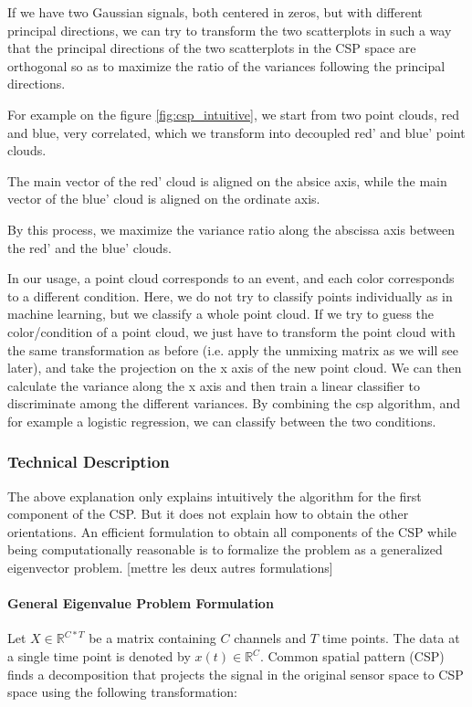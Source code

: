If we have two Gaussian signals, both centered in zeros, but with different principal directions, we can try to transform the two scatterplots in such a way that the principal directions of the two scatterplots in the CSP space are orthogonal so as to maximize the ratio of the variances following the principal directions.

For example on the figure \ref{fig:csp_intuitive}, we start from two point clouds, red and blue, very correlated, which we transform into decoupled red' and blue' point clouds.

The main vector of the red' cloud is aligned on the absice axis, while the main vector of the blue' cloud is aligned on the ordinate axis.

By this process, we maximize the variance ratio along the abscissa axis between the red' and the blue' clouds.

In our usage, a point cloud corresponds to an event, and each color corresponds to a different condition. Here, we do not try to classify points individually as in machine learning, but we classify a whole point cloud. If we try to guess the color/condition of a point cloud, we just have to transform the point cloud with the same transformation as before (i.e. apply the unmixing matrix as we will see later), and take the projection on the x axis of the new point cloud. We can then calculate the variance along the x axis and then train a linear classifier to discriminate among the different variances. By combining the csp algorithm, and for example a logistic regression, we can classify between the two conditions.

\subsubsection{Technical Description}

The above explanation only explains intuitively the algorithm for the first component of the CSP. But it does not explain how to obtain the other orientations. An efficient formulation to obtain all components of the CSP while being computationally reasonable is to formalize the problem as a generalized eigenvector problem.
[mettre les deux autres formulations]

\paragraph{General Eigenvalue Problem Formulation}

Let $X \in \mathbb{R}^{C * T}$ be a matrix containing $C$ channels and $T$ time points. The data at a single time point is denoted by $x(t) \in  \mathbb{R}^{C}$. Common spatial pattern (CSP) finds a decomposition that projects the signal in the original sensor space to CSP space using the following transformation:


